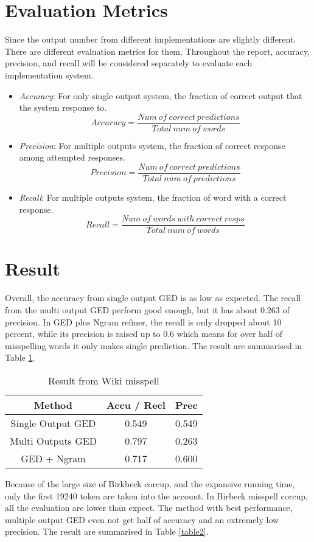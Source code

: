 \documentclass[11pt]{article}
\begin{document}
\section{Evaluation Metrics}
Since the output number from different implementations are slightly different. There are different evaluation metrics for them. Throughout the report, accuracy, precision, and recall will be considered separately to evaluate each implementation system.
\begin{itemize}
\item \emph{Accuracy}: For only single output system, the fraction of correct output that the system response to.
\[Accuracy = \frac{Num\ of\ correct\ predictions}{Total\ num\ of\ words}\]
\item \emph{Precision}: For multiple outputs system, the fraction of correct response among attempted responses.
\[Precision = \frac{Num\ of\ correct\ predictions}{Total\ num\ of\ predictions}\]
\item \emph{Recall}: For multiple outputs system, the fraction of word with a correct response.
\[Recall = \frac{Num\ of\ words\ with\ correct\ resps}{Total\ num\ of\ words}\]
\end{itemize}

\section{Result}
Overall, the accuracy from single output GED is as low as expected. The recall from the multi output GED perform good enough, but it has about 0.263 of precision. In GED plus Ngram refiner, the recall is only dropped about 10 percent, while its precision is raised up to 0.6 which means for over half of misspelling words it only makes single prediction. The result are summarised in Table \ref{table1}.

\begin{table}[h]
\begin{center}
\begin{tabular}{|c|c|c|}

    \hline
    Method & Accu / Recl & Prec\\
    \hline
  
    Single Output GED & 0.549 & 0.549\\
	 \hline    
    Multi Outputs GED & 0.797 & 0.263\\
    \hline
    GED + Ngram & 0.717 & 0.600\\
    \hline
\end{tabular}
\caption{Result from Wiki misspell}
\label{table1}
\end{center}
\end{table}
Because of the large size of Birkbeck corcup, and the expansive running time, only the first 19240 token are taken into the account. In Birbeck misspell corcup, all the evaluation are lower than expect. The method with best performance, multiple output GED even not get half of accuracy and an extremely low precision. The result are summarised in Table \ref{table2}.
\end{document}
